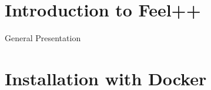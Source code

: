 \section{Introduction to Feel++}
\begin{frame}{General Presentation}

\end{frame}

\section{Installation with Docker}
\begin{frame}

\end{frame}
